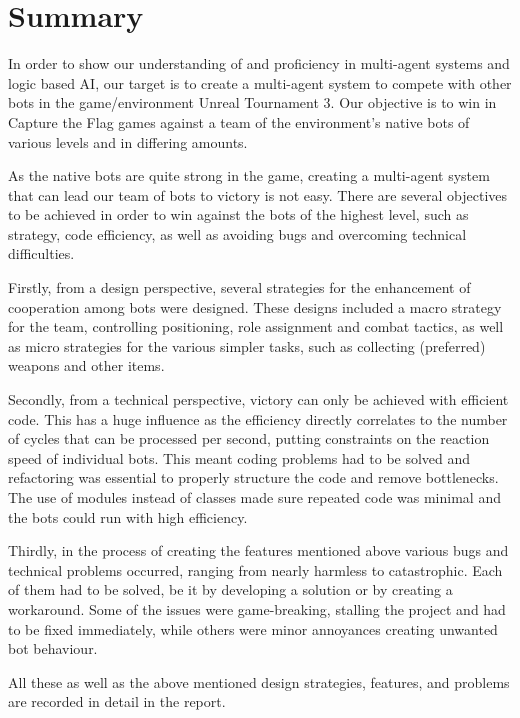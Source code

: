 \chapter*{Summary}
In order to show our understanding of and proficiency in multi-agent systems and logic based AI, our target is to create a multi-agent system to compete with other bots in the game/environment Unreal Tournament 3. Our objective is to win in Capture the Flag games against a team of the environment's native bots of various levels and in differing amounts.
 
As the native bots are quite strong in the game, creating a multi-agent system that can lead our team of bots to victory is not easy. There are several objectives to be achieved in order to win against the bots of the highest level, such as strategy, code efficiency, as well as avoiding bugs and overcoming technical difficulties.

Firstly, from a design perspective, several strategies for the enhancement of cooperation among bots were designed. These designs included a macro strategy for the team, controlling positioning, role assignment and combat tactics, as well as micro strategies for the various simpler tasks, such as collecting (preferred) weapons and other items.

Secondly, from a technical perspective, victory can only be achieved with efficient code. This has a huge influence as the efficiency directly correlates to the number of cycles that can be processed per second, putting constraints on the reaction speed of individual bots. This meant coding problems had to be solved and refactoring was essential to properly structure the code and remove bottlenecks. The use of modules instead of classes made sure repeated code was minimal and the bots could run with high efficiency. 

Thirdly, in the process of creating the features mentioned above various bugs and technical problems occurred, ranging from nearly harmless to catastrophic. Each of them had to be solved, be it by developing a solution or by creating a workaround. Some of the issues were game-breaking, stalling the project and had to be fixed immediately, while others were minor annoyances creating unwanted bot behaviour.

All these as well as the above mentioned design strategies, features, and problems are recorded in detail in the report.